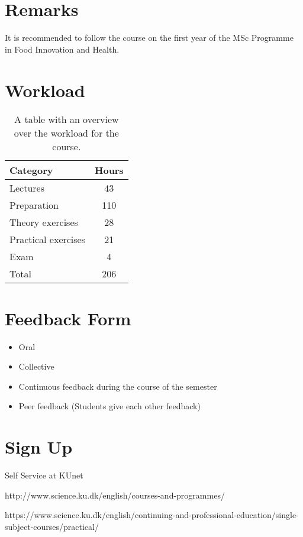 \section{Remarks}
It is recommended to follow the course on the first year of the MSc Programme in Food Innovation and Health.

\section{Workload}
\begin{table}
    \centering
    \caption{A table with an overview over the workload for the course.}
    \label{tab:workload}
    \begin{tabular}{ l | c}
        \textbf{Category} & \textbf{Hours} \\ 
        \hline
        Lectures & 43 \\ 
        Preparation & 110 \\
        Theory exercises & 28 \\ 
        Practical exercises & 21 \\ 
        Exam & 4 \\ 
        \hline
        Total & 206 \\ 
    \end{tabular}
\end{table}

\section{Feedback Form}
\begin{highlight}
    \begin{itemize}
        \item Oral
        \item Collective
        \item Continuous feedback during the course of the semester
        \item Peer feedback (Students give each other feedback)
    \end{itemize}
\end{highlight}

\section{Sign Up}
Self Service at KUnet

http://www.science.ku.dk/english/courses-and-programmes/

https://www.science.ku.dk/english/continuing-and-professional-education/single-subject-courses/practical/

